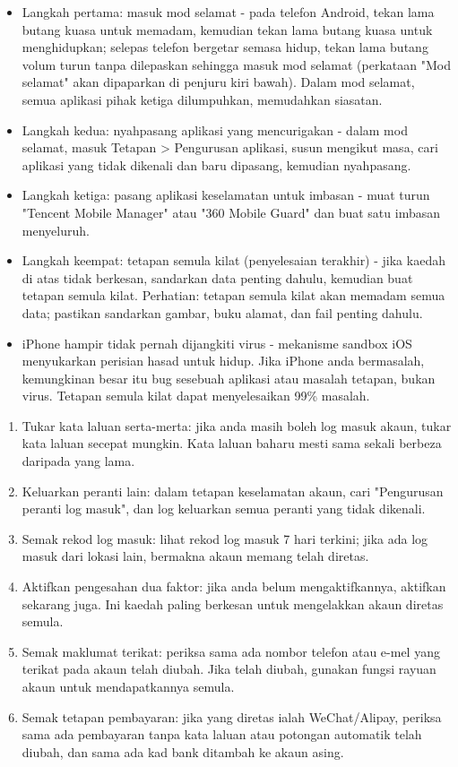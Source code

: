 \begin{itemize}
  \item Langkah pertama: masuk mod selamat - pada telefon Android, tekan lama butang kuasa untuk memadam, kemudian tekan lama butang kuasa untuk menghidupkan; selepas telefon bergetar semasa hidup, tekan lama butang volum turun tanpa dilepaskan sehingga masuk mod selamat (perkataan "Mod selamat" akan dipaparkan di penjuru kiri bawah). Dalam mod selamat, semua aplikasi pihak ketiga dilumpuhkan, memudahkan siasatan.
  \item Langkah kedua: nyahpasang aplikasi yang mencurigakan - dalam mod selamat, masuk Tetapan > Pengurusan aplikasi, susun mengikut masa, cari aplikasi yang tidak dikenali dan baru dipasang, kemudian nyahpasang.
  \item Langkah ketiga: pasang aplikasi keselamatan untuk imbasan - muat turun "Tencent Mobile Manager" atau "360 Mobile Guard" dan buat satu imbasan menyeluruh.
  \item Langkah keempat: tetapan semula kilat (penyelesaian terakhir) - jika kaedah di atas tidak berkesan, sandarkan data penting dahulu, kemudian buat tetapan semula kilat. Perhatian: tetapan semula kilat akan memadam semua data; pastikan sandarkan gambar, buku alamat, dan fail penting dahulu.
  \item iPhone hampir tidak pernah dijangkiti virus - mekanisme sandbox iOS menyukarkan perisian hasad untuk hidup. Jika iPhone anda bermasalah, kemungkinan besar itu bug sesebuah aplikasi atau masalah tetapan, bukan virus. Tetapan semula kilat dapat menyelesaikan 99\% masalah.
\end{itemize}


\begin{enumerate}
  \item Tukar kata laluan serta-merta: jika anda masih boleh log masuk akaun, tukar kata laluan secepat mungkin. Kata laluan baharu mesti sama sekali berbeza daripada yang lama.
  \item Keluarkan peranti lain: dalam tetapan keselamatan akaun, cari "Pengurusan peranti log masuk", dan log keluarkan semua peranti yang tidak dikenali.
  \item Semak rekod log masuk: lihat rekod log masuk 7 hari terkini; jika ada log masuk dari lokasi lain, bermakna akaun memang telah diretas.
  \item Aktifkan pengesahan dua faktor: jika anda belum mengaktifkannya, aktifkan sekarang juga. Ini kaedah paling berkesan untuk mengelakkan akaun diretas semula.
  \item Semak maklumat terikat: periksa sama ada nombor telefon atau e-mel yang terikat pada akaun telah diubah. Jika telah diubah, gunakan fungsi rayuan akaun untuk mendapatkannya semula.
  \item Semak tetapan pembayaran: jika yang diretas ialah WeChat/Alipay, periksa sama ada pembayaran tanpa kata laluan atau potongan automatik telah diubah, dan sama ada kad bank ditambah ke akaun asing.
\end{enumerate}

